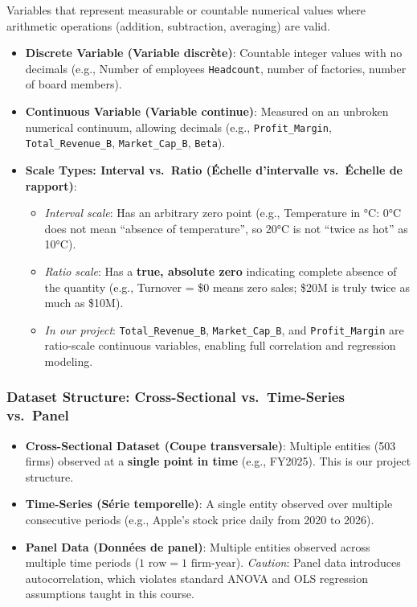 \documentclass[
]{article}
\providecommand{\tightlist}{%
  \setlength{\itemsep}{0pt}\setlength{\parskip}{0pt}}
\begin{document}
Variables that represent measurable or countable numerical values where
arithmetic operations (addition, subtraction, averaging) are valid.

\begin{itemize}
\tightlist
\item
  \textbf{Discrete Variable (Variable discrète)}: Countable integer
  values with no decimals (e.g., Number of employees \texttt{Headcount},
  number of factories, number of board members).
\item
  \textbf{Continuous Variable (Variable continue)}: Measured on an
  unbroken numerical continuum, allowing decimals (e.g.,
  \texttt{Profit\_Margin}, \texttt{Total\_Revenue\_B},
  \texttt{Market\_Cap\_B}, \texttt{Beta}).
\item
  \textbf{Scale Types: Interval vs.~Ratio (Échelle d'intervalle
  vs.~Échelle de rapport)}:

  \begin{itemize}
  \tightlist
  \item
    \emph{Interval scale}: Has an arbitrary zero point (e.g.,
    Temperature in °C: 0°C does not mean ``absence of temperature'', so
    20°C is not ``twice as hot'' as 10°C).
  \item
    \emph{Ratio scale}: Has a \textbf{true, absolute zero} indicating
    complete absence of the quantity (e.g., Turnover = \$0 means zero
    sales; \$20M is truly twice as much as \$10M).
  \item
    \emph{In our project}: \texttt{Total\_Revenue\_B},
    \texttt{Market\_Cap\_B}, and \texttt{Profit\_Margin} are ratio-scale
    continuous variables, enabling full correlation and regression
    modeling.
  \end{itemize}
\end{itemize}

\subsubsection{Dataset Structure: Cross-Sectional vs.~Time-Series
vs.~Panel}\label{dataset-structure-cross-sectional-vs.-time-series-vs.-panel}

\begin{itemize}
\tightlist
\item
  \textbf{Cross-Sectional Dataset (Coupe transversale)}: Multiple
  entities (503 firms) observed at a \textbf{single point in time}
  (e.g., FY2025). This is our project structure.
\item
  \textbf{Time-Series (Série temporelle)}: A single entity observed over
  multiple consecutive periods (e.g., Apple's stock price daily from
  2020 to 2026).
\item
  \textbf{Panel Data (Données de panel)}: Multiple entities observed
  across multiple time periods (\(1\text{ row} = 1\text{ firm-year}\)).
  \emph{Caution}: Panel data introduces autocorrelation, which violates
  standard ANOVA and OLS regression assumptions taught in this course.
\end{itemize}
\end{document}
